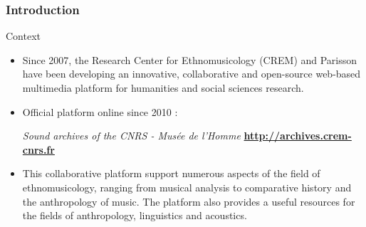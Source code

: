 \documentclass[final, hyperref, table]{beamer}
\begin{document}
\begin{frame}\frametitle{Introduction}
 \begin{block}{Context}
   \begin{itemize}
   \item Since 2007, the Research Center for Ethnomusicology (CREM) and Parisson
     have been developing an innovative, collaborative and
     open-source \alert{web-based multimedia platform} for \alert{humanities and social sciences research}.

   \item Official platform online since 2010 : 
     \vspace{-0.1cm}\begin{center}
\emph{Sound archives of the CNRS - Musée de l'Homme}
       \colorbox{yellow!40} {\bf \url{http://archives.crem-cnrs.fr}}
     \end{center}
   \item This \alert{collaborative} platform support numerous aspects of the field of
     \alert{ethnomusicology}, ranging from musical analysis to comparative
     history and the anthropology of music. The platform also provides
     a useful resources for the fields of anthropology, linguistics
     and acoustics.
   \end{itemize}
\end{block}
\end{frame}
\end{document}
